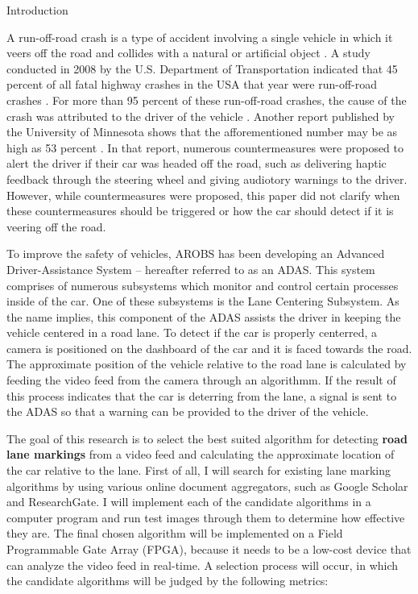 \documentclass{matthijs}
\begin{document}
	\begin{hoofdstuk}{Introduction}

		A run-off-road crash is a type of accident involving a single vehicle in which it veers off the road and collides with a natural or artificial object \cite{liu2009factors}.
		A study conducted in 2008 by the U.S. Department of Transportation indicated that 45 percent of all fatal highway crashes in the USA that year were run-off-road crashes \cite{dod2011run}.
		For more than 95 percent of these run-off-road crashes, the cause of the crash was attributed to the driver of the vehicle \cite{dod2011run}.
		Another report published by the University of Minnesota shows that the afforementioned number may be as high as 53 percent \cite{edwards2013pilot}.
		In that report, numerous countermeasures were proposed to alert the driver if their car was headed off the road, such as delivering haptic feedback through the steering wheel and giving audiotory warnings to the driver.
		However, while countermeasures were proposed, this paper did not clarify when these countermeasures should be triggered or how the car should detect if it is veering off the road.
		
		\bigskip

		To improve the safety of vehicles, AROBS has been developing an Advanced Driver-Assistance System -- hereafter referred to as an ADAS.
		This system comprises of numerous subsystems which monitor and control certain processes inside of the car.
		One of these subsystems is the Lane Centering Subsystem.
		As the name implies, this component of the ADAS assists the driver in keeping the vehicle centered in a road lane.
		To detect if the car is properly centerred, a camera is positioned on the dashboard of the car and it is faced towards the road.
		The approximate position of the vehicle relative to the road lane is calculated by feeding the video feed from the camera through an algorithmm.
		If the result of this process indicates that the car is deterring from the lane, a signal is sent to the ADAS so that a warning can be provided to the driver of the vehicle.
		
		\bigskip

		The goal of this research is to select the best suited algorithm for detecting \textbf{road lane markings} from a video feed and calculating the approximate location of the car relative to the lane.
		First of all, I will search for existing lane marking algorithms by using various online document aggregators, such as Google Scholar and ResearchGate.
		I will implement each of the candidate algorithms in a computer program and run test images through them to determine how effective they are.
		The final chosen algorithm will be implemented on a Field Programmable Gate Array (FPGA), because it needs to be a low-cost device that can analyze the video feed in real-time.
		A selection process will occur, in which the candidate algorithms will be judged by the following metrics:


\end{hoofdstuk}
\end{document}
